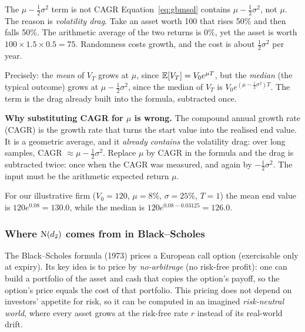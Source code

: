 \begin{warnbox}{The $\mu-\tfrac12\sigma^2$ term is not CAGR}
Equation~\eqref{eq:gbmsol} contains $\mu-\tfrac12\sigma^2$, not $\mu$. The reason is \emph{volatility drag}. Take an asset worth 100 that rises 50\% and then falls 50\%. The arithmetic average of the two returns is $0\%$, yet the asset is worth $100\times1.5\times0.5=75$. Randomness costs growth, and the cost is about $\tfrac12\sigma^2$ per year.

Precisely: the \emph{mean} of $V_T$ grows at $\mu$, since $\mathbb{E}[V_T]=V_0e^{\mu T}$, but the \emph{median} (the typical outcome) grows at $\mu-\tfrac12\sigma^2$, since the median of $V_T$ is $V_0e^{(\mu-\frac12\sigma^2)T}$. The term is the drag already built into the formula, subtracted once.

\textbf{Why substituting CAGR for $\mu$ is wrong.} The compound annual growth rate (CAGR) is the growth rate that turns the start value into the realised end value. It is a geometric average, and it \emph{already contains} the volatility drag: over long samples, CAGR $\approx\mu-\tfrac12\sigma^2$. Replace $\mu$ by CAGR in the formula and the drag is subtracted twice: once when the CAGR was measured, and again by $-\tfrac12\sigma^2$. The input must be the arithmetic expected return $\mu$.
\end{warnbox}

For our illustrative firm ($V_0=120$, $\mu=8\%$, $\sigma=25\%$, $T=1$) the mean end value is $120e^{0.08}=130.0$, while the median is $120e^{0.08-0.03125}=126.0$.

\subsubsection{Where $\mathrm{N}(d_2)$ comes from in Black--Scholes}
The Black--Scholes formula (1973) \cite{blackScholes1973} prices a European call option (exercisable only at expiry). Its key idea is to price by \emph{no-arbitrage} (no risk-free profit): one can build a portfolio of the asset and cash that copies the option's payoff, so the option's price equals the cost of that portfolio. This pricing does not depend on investors' appetite for risk, so it can be computed in an imagined \emph{risk-neutral world}, where every asset grows at the risk-free rate $r$ instead of its real-world drift.

